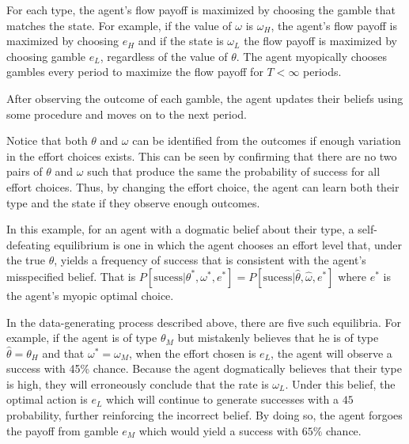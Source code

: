 \documentclass[
  12pt,
]{article}
\begin{document}
For each type, the agent's flow payoff is maximized by choosing the
gamble that matches the state. For example, if the value of \(\omega\)
is \(\omega_H\), the agent's flow payoff is maximized by choosing
\(e_H\) and if the state is \(\omega_L\) the flow payoff is maximized by
choosing gamble \(e_L\), regardless of the value of \(\theta\). The
agent myopically chooses gambles every period to maximize the flow
payoff for \(T<\infty\) periods.

After observing the outcome of each gamble, the agent updates their
beliefs using some procedure and moves on to the next period.

Notice that both \(\theta\) and \(\omega\) can be identified from the
outcomes if enough variation in the effort choices exists. This can be
seen by confirming that there are no two pairs of \(\theta\) and
\(\omega\) such that produce the same the probability of success for all
effort choices. Thus, by changing the effort choice, the agent can learn
both their type and the state if they observe enough outcomes.

In this example, for an agent with a dogmatic belief about their type, a
self-defeating equilibrium is one in which the agent chooses an effort
level that, under the true \(\theta\), yields a frequency of success
that is consistent with the agent's misspecified belief. That is
\(P[\text{sucess}|\theta^*, \omega^*, e^*] = P[\text{sucess}|\hat{\theta}, \hat{\omega}, e^*]\)
where \(e^*\) is the agent's myopic optimal choice.

In the data-generating process described above, there are five such
equilibria. For example, if the agent is of type \(\theta_M\) but
mistakenly believes that he is of type \(\hat{\theta}=\theta_H\) and
that \(\omega^* = \omega_M\), when the effort chosen is \(e_L\), the
agent will observe a success with 45\% chance. Because the agent
dogmatically believes that their type is high, they will erroneously
conclude that the rate is \(\omega_L\). Under this belief, the optimal
action is \(e_L\) which will continue to generate successes with a \(45%
\) probability, further reinforcing the incorrect belief. By doing so,
the agent forgoes the payoff from gamble \(e_M\) which would yield a
success with \(65\%\) chance.
\end{document}
